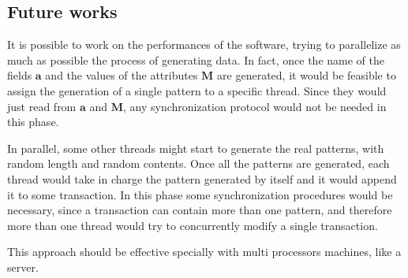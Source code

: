 \documentclass{acm_proc_article-sp-sigmod09}
\begin{document}
\subsection{Future works}
It is possible to work on the performances of the software, trying to parallelize as much as possible the process of generating data. In fact, once the name of the fields $\boldsymbol{a}$ and the values of the attributes $\boldsymbol{M}$ are generated, it would be feasible to assign the generation of a single pattern to a specific thread. Since they would just read from $\boldsymbol{a}$ and $\boldsymbol{M}$, any synchronization protocol would not be needed in this phase.

In parallel, some other threads might start to generate the real patterns, with random length and random contents. Once all the patterns are generated, each thread would take in charge the pattern generated by itself and it would append it to some transaction. In this phase some synchronization procedures would be necessary, since a transaction can contain more than one pattern, and therefore more than one thread would try to concurrently modify a single transaction.

This approach should be effective specially with multi processors machines, like a server.



\end{document}
